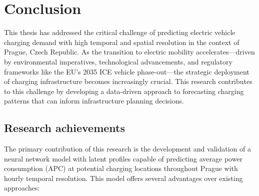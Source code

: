 \setchapterpreamble[u]{\margintoc}
\chapter{Conclusion}

This thesis has addressed the critical challenge of predicting electric vehicle charging demand with high temporal and spatial resolution in the context of Prague, Czech Republic. As the transition to electric mobility accelerates—driven by environmental imperatives, technological advancements, and regulatory frameworks like the EU's 2035 ICE vehicle phase-out—the strategic deployment of charging infrastructure becomes increasingly crucial. This research contributes to this challenge by developing a data-driven approach to forecasting charging patterns that can inform infrastructure planning decisions.

\section{Research achievements}

The primary contribution of this research is the development and validation of a neural network model with latent profiles capable of predicting average power consumption (APC) at potential charging locations throughout Prague with hourly temporal resolution. This model offers several advantages over existing approaches:


